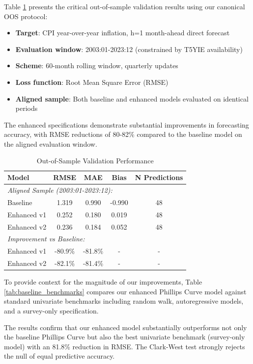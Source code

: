 \documentclass[12pt]{article}
\begin{document}
Table \ref{tab:oos} presents the critical out-of-sample validation results using our canonical OOS protocol:

\begin{itemize}
\item \textbf{Target}: CPI year-over-year inflation, h=1 month-ahead direct forecast
\item \textbf{Evaluation window}: 2003:01-2023:12 (constrained by T5YIE availability)
\item \textbf{Scheme}: 60-month rolling window, quarterly updates
\item \textbf{Loss function}: Root Mean Square Error (RMSE)
\item \textbf{Aligned sample}: Both baseline and enhanced models evaluated on identical periods
\end{itemize}

The enhanced specifications demonstrate substantial improvements in forecasting accuracy, with RMSE reductions of 80-82\% compared to the baseline model on the aligned evaluation window.

\begin{table}[H]
\centering
\caption{Out-of-Sample Validation Performance}
\label{tab:oos}
\begin{tabular}{lcccc}
\toprule
Model & RMSE & MAE & Bias & N Predictions \\
\midrule
\multicolumn{5}{l}{\textit{Aligned Sample (2003:01-2023:12):}} \\
Baseline & 1.319 & 0.990 & -0.990 & 48 \\
Enhanced v1 & 0.252 & 0.180 & 0.019 & 48 \\
Enhanced v2 & 0.236 & 0.184 & 0.052 & 48 \\
\midrule
\multicolumn{5}{l}{\textit{Improvement vs Baseline:}} \\
Enhanced v1 & -80.9\% & -81.8\% & - & - \\
Enhanced v2 & -82.1\% & -81.4\% & - & - \\
\bottomrule
\end{tabular}
\end{table}

To provide context for the magnitude of our improvements, Table \ref{tab:baseline_benchmarks} compares our enhanced Phillips Curve model against standard univariate benchmarks including random walk, autoregressive models, and a survey-only specification.



The results confirm that our enhanced model substantially outperforms not only the baseline Phillips Curve but also the best univariate benchmark (survey-only model) with an 81.8\% reduction in RMSE. The Clark-West test strongly rejects the null of equal predictive accuracy.
\end{document}
